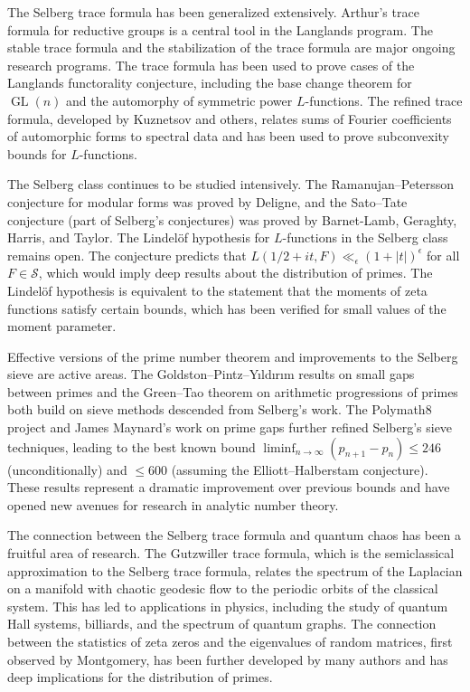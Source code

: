 The Selberg trace formula has been generalized extensively. Arthur's trace formula for reductive groups is a central tool in the Langlands program. The stable trace formula and the stabilization of the trace formula are major ongoing research programs. The trace formula has been used to prove cases of the Langlands functorality conjecture, including the base change theorem for $\operatorname{GL}(n)$ and the automorphy of symmetric power $L$-functions. The refined trace formula, developed by Kuznetsov and others, relates sums of Fourier coefficients of automorphic forms to spectral data and has been used to prove subconvexity bounds for $L$-functions.

The Selberg class continues to be studied intensively. The Ramanujan--Petersson conjecture for modular forms was proved by Deligne, and the Sato--Tate conjecture (part of Selberg's conjectures) was proved by Barnet-Lamb, Geraghty, Harris, and Taylor. The Lindel\"{o}f hypothesis for $L$-functions in the Selberg class remains open. The conjecture predicts that $L(1/2 + it, F) \ll_\epsilon (1+|t|)^\epsilon$ for all $F \in \mathcal{S}$, which would imply deep results about the distribution of primes. The Lindel\"{o}f hypothesis is equivalent to the statement that the moments of zeta functions satisfy certain bounds, which has been verified for small values of the moment parameter.

Effective versions of the prime number theorem and improvements to the Selberg sieve are active areas. The Goldston--Pintz--Y{\i}ld{\i}r{\i}m results on small gaps between primes and the Green--Tao theorem on arithmetic progressions of primes both build on sieve methods descended from Selberg's work. The Polymath8 project and James Maynard's work on prime gaps further refined Selberg's sieve techniques, leading to the best known bound $\liminf_{n \to \infty} (p_{n+1} - p_n) \leq 246$ (unconditionally) and $\leq 600$ (assuming the Elliott--Halberstam conjecture). These results represent a dramatic improvement over previous bounds and have opened new avenues for research in analytic number theory.

The connection between the Selberg trace formula and quantum chaos has been a fruitful area of research. The Gutzwiller trace formula, which is the semiclassical approximation to the Selberg trace formula, relates the spectrum of the Laplacian on a manifold with chaotic geodesic flow to the periodic orbits of the classical system. This has led to applications in physics, including the study of quantum Hall systems, billiards, and the spectrum of quantum graphs. The connection between the statistics of zeta zeros and the eigenvalues of random matrices, first observed by Montgomery, has been further developed by many authors and has deep implications for the distribution of primes.

